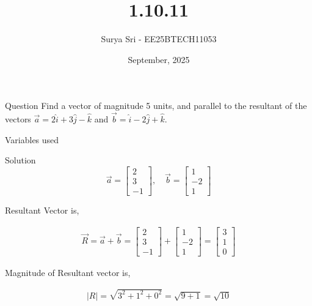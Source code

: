 \documentclass{beamer}
\title 
{1.10.11}
\date{September, 2025}
\author 
{Surya Sri - EE25BTECH11053}
\begin{document}
\frame{\titlepage}
\begin{frame}{Question}
Find a vector of magnitude 5 units, and parallel to the resultant of the vectors $\vec{a} = 2\hat{i} + 3\hat{j} - \hat{k}$ and $\vec{b} = \hat{i} - 2\hat{j} + \hat{k}$.
\end{frame}



\begin{frame}{Variables used}
\begin{table}[H]    
  \centering
  
  \caption{Variables Used}
  \label{tab:1.5.39}
\end{table}

\end{frame}

\begin{frame}{Solution}
$$
\vec{a} = \begin{bmatrix} 2 \\ 3 \\ -1 \end{bmatrix}, \quad
\vec{b} = \begin{bmatrix} 1 \\ -2 \\ 1 \end{bmatrix}
$$

 Resultant Vector is,

\begin{align}
\vec{R} = \vec{a} + \vec{b} = 
\begin{bmatrix} 2 \\ 3 \\ -1 \end{bmatrix} + \begin{bmatrix} 1 \\ -2 \\ 1 \end{bmatrix}
= \begin{bmatrix} 3 \\ 1 \\ 0 \end{bmatrix}
\end{align}

Magnitude of Resultant vector is,

\begin{align}
|{R}| = \sqrt{3^2 + 1^2 + 0^2} = \sqrt{9 + 1} = \sqrt{10}
\end{align}



\end{frame}
\end{document}
